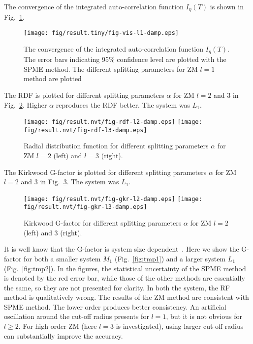 \documentclass[aip,jcp,a4paper,preprint,unsortedaddress,onecolumn,fleqn]{revtex4-1}
\newcommand{\systemmb}{M_1}
\newcommand{\systemlb}{L_1}
\begin{document}
The convergence of the integrated auto-correlation function $I_\eta(T) $ is shown in Fig.~\ref{fig:damp-vis-l1}.
\begin{figure}
  \centering
  \texttt{[image: fig/result.tiny/fig-vis-l1-damp.eps]}
  \caption{The convergence of the integrated auto-correlation function $I_\eta(T) $. The error bars indicating 95\% confidence level are plotted with the SPME method. The different splitting parameters for ZM $l=1$ method are plotted}
  \label{fig:damp-vis-l1}
\end{figure}


The RDF is plotted for different splitting parameters $\alpha$ for ZM $l=2$ and 3 in Fig.~\ref{fig:damp-rdf-l23}. Higher $\alpha$ reproduces the RDF better.
The system was $L_1$.
\begin{figure}[]
  \centering
  \texttt{[image: fig/result.nvt/fig-rdf-l2-damp.eps]}
  \texttt{[image: fig/result.nvt/fig-rdf-l3-damp.eps]}
  \caption{Radial distribution function for different splitting parameters $\alpha$ for ZM $l=2$ (left) and $l=3$ (right).}
  \label{fig:damp-rdf-l23}
\end{figure}

The Kirkwood G-factor is plotted for different splitting parameters $\alpha$ for ZM $l=2$ and 3 in Fig.~\ref{fig:damp-gkr-l23}. 
The system was $L_1$.
\begin{figure}[]
  \centering
  \texttt{[image: fig/result.nvt/fig-gkr-l2-damp.eps]}
  \texttt{[image: fig/result.nvt/fig-gkr-l3-damp.eps]}
  \caption{Kirkwood G-factor for different splitting parameters $\alpha$ for ZM $l=2$ (left) and 3 (right).}
  \label{fig:damp-gkr-l23}
\end{figure}


It is well know that the G-factor is system size
dependent~\cite{vanderSpoel2006origin}. Here we show the G-factor for
both a smaller system $\systemmb$ (Fig.~\ref{fig:tmp1}) and a larger system $\systemlb$
(Fig.~\ref{fig:tmp2}).  In the figures, the statistical uncertainty of
the SPME method is denoted by the red error bar, while those of the
other methods are essentially the same, so they are not presented for
clarity.  In both the system, the RF method is qualitatively
wrong. The results of the ZM method are consistent with SPME
method. The lower order produces better consistency.  An artificial
oscillation around the cut-off radius presents for $l=1$, but it is
not obvious for $l\geq 2$.  For high order ZM (here $l=3$ is investigated),
using larger cut-off radius can substantially improve the accuracy.
\end{document}
